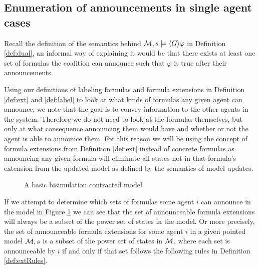 
\subsection{Enumeration of announcements in single agent cases}

Recall the definition of the semantics behind $\mathcal{M},s \models \langle G\rangle\varphi$ in Definition \ref{def:dual}, an informal way of explaining it would be that there exists at least one set of formulas the coalition can announce such that $\varphi$ is true after their announcements. 

Using our definitions of labeling formulas and formula extensions in Definition \ref{def:ext} and \ref{def:label} to look at what kinds of formulas any given agent can announce, we note that the goal is to convey information to the other agents in the system. Therefore we do not need to look at the formulas themselves, but only at what consequence announcing them would have and whether or not the agent is able to announce them. For this reason we will be using the concept of formula extensions from Definition \ref{def:ext} instead of concrete formulas as announcing any given formula will eliminate all states not in that formula's extension from the updated model as defined by the semantics of model updates.

\begin{figure}[h]
	\label{fig:GAexample}
	\centering
	\caption{A basic bisimulation contracted model.}
\end{figure}

If we attempt to determine which sets of formulas some agent $i$ can announce in the model in Figure \ref{fig:GAexample} we can see that the set of announceable formula extensions will always be a subset of the power set of states in the model. Or more precisely, the set of announceable formula extensions for some agent $i$ in a given pointed model $\mathcal{M},s$ is a subset of the power set of states in $\mathcal{M}$, where each set is announceable by $i$ if and only if that set follows the following rules in Definition \ref{def:extRules}.

